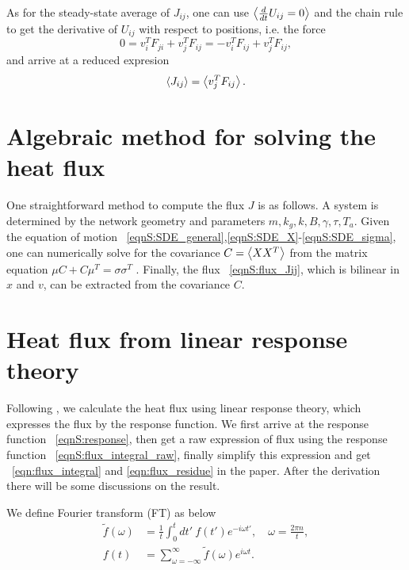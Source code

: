 \documentclass[
 amsmath,amssymb,
 aps,
 pre,
 longbibliography,
 10pt, onecolumn,
 notitlepage
]{revtex4-1}
\begin{document}
As for the steady-state average of $J_{ij}$, one can use $\expval{\frac{d}{dt}U_{ij}=0}$ and the chain rule to get the derivative of $U_{ij}$ with respect to positions, i.e. the force
\begin{equation}
    0 = v_i^T F_{ji} + v_j^T F_{ij}
    = -v_i^T F_{ij} + v_j^T F_{ij},
\end{equation}
and arrive at a reduced expresion
\begin{equation}
    \expval{J_{ij}} = \expval{v_j^T F_{ij}}.
\end{equation}


\section{Algebraic method for solving the heat flux}
One straightforward method to compute the flux $J$ is as follows.
A system is determined by the network geometry and parameters $m, k_g, k, B, \gamma, \tau, T_a$.
Given the equation of motion \eqnname~\eqref{eqnS:SDE_general},\eqref{eqnS:SDE_X}-\eqref{eqnS:SDE_sigma}, one can numerically solve for the covariance $C=\expval{XX^T}$ from the matrix equation $\mu C + C \mu^T = \sigma\sigma^T$ \cite{Gardiner2009TheEquations,Ceriotti2010Colored-NoiseCarte}.
Finally, the flux \eqnname~\eqref{eqnS:flux_Jij}, which is bilinear in $x$ and $v$, can be extracted from the covariance $C$.


\section{Heat flux from linear response theory}
Following \cite{Kundu2011LargeChains}, we calculate the heat flux using linear response theory, which expresses the flux by the response function.
We first arrive at the response function \eqnname~\eqref{eqnS:response}, then get a raw expression of flux using the response function \eqnname~\eqref{eqnS:flux_integral_raw}, finally simplify this expression and get \eqnname~\eqref{eqn:flux_integral} and \eqref{eqn:flux_residue} in the paper.
After the derivation there will be some discussions on the result.

We define Fourier transform (FT) as below
\begin{align}
\tilde{f}(\omega) &= \frac{1}{t} \int_0^t dt'\ f(t')e^{-i\omega t'},\quad
\omega = \frac{2\pi n}{t} ,\\
f(t) &= \sum_{\omega=-\infty}^{\infty} \tilde{f}(\omega) e^{i\omega t} .
\end{align}
\end{document}
